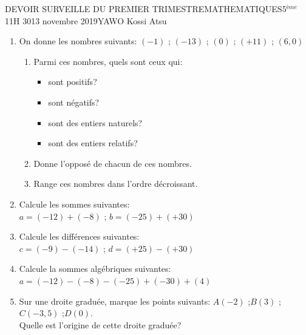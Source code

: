 \documentclass[12pt,a4paper]{book}
\newcommand{\prof}{YAWO Kossi Atsu}
\newcommand{\matiere}{MATHEMATIQUES}
\newcommand{\classe}{5$^{ème}$}
\begin{document}
\begin{devoir}{DEVOIR SURVEILLE DU PREMIER TRIMESTRE}{\matiere}{\classe}{1}{1H 30}{13 novembre 2019}{\prof}
\begin{exo}[4]
\end{exo}

\begin{exo}[8]
\begin{enumerate}
\item On donne les nombres suivants: $(-1)$ \qquad ; \qquad $(-13)$ \qquad ; \qquad $(0)$ \qquad ; \qquad $(+11)$ \qquad ; \qquad $(6,0)$
\begin{enumerate}
\item Parmi ces nombres, quels sont ceux qui: 
\begin{itemize}
\item sont positifs?
\item sont négatifs?
\item sont des entiers naturels?
\item sont des entiers relatifs?
\end{itemize} 
\item Donne l'opposé de chacun de ces nombres.
\item Range ces nombres dans l'ordre décroissant.
\end{enumerate}
\item Calcule les sommes suivantes:\\
$a=(-12)+(-8)$ \qquad ; \qquad $b=(-25)+(+30)$
\item Calcule les différences suivantes:\\
$c=(-9)-(-14)$ \qquad ; \qquad $d=(+25)-(+30)$
\item Calcule la sommes algébriques suivantes:\\
$a=(-12)-(-8)-(-25)+(-30)+(4)$
\item Sur une droite graduée, marque les points suivants: $A(-2)$ \qquad ;\qquad $B(3)$ \qquad ; \qquad $C(-3,5)$ \qquad ;\qquad $D(0)$.\\
Quelle est l'origine de cette droite graduée?
\end{enumerate}
\end{exo}
\end{devoir}

\newpage
\end{document}

